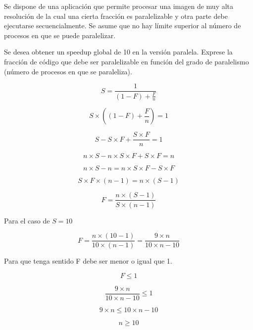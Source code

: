 \begin{acexercise}\end{acexercise}

Se dispone de una aplicación que permite procesar una imagen de muy alta
resolución de la cual una cierta fracción es paralelizable y otra parte debe
ejecutarse secuencialmente. Se asume que no hay límite superior al número de
procesos en que se puede paralelizar.

Se desea obtener un speedup global de 10 en la versión paralela.  Exprese la
fracción de código que debe ser paralelizable en función del grado de
paralelismo (número de procesos en que se paraleliza).


\begin{acsolution}\end{acsolution}

\[
S = \frac{1}{\left(1 - F \right) + \displaystyle \frac{F}{n} }
\]

\[
S \times \left( (1-F) + \frac{F}{n} \right) = 1
\]

\[
S - S \times F + \frac{S \times F}{n} = 1
\]

\[
n \times S - n \times S \times F + S \times F = n
\]

\[
n \times S - n = n \times S \times F - S \times F
\]

\[
S \times F \times \left( n - 1 \right) = n \times \left( S - 1 \right)
\]

\[
F = \frac{n \times (S-1)}{S \times(n-1)}
\]

Para el caso de $S = 10$

\[
F = \frac{n \times (10-1)}{10 \times (n-1)} = 
\frac{9 \times n}{10 \times n - 10}
\]

Para que tenga sentido F debe ser menor o igual que 1. 

\[
F \leq 1
\]

\[
\frac{9 \times n}{10 \times n -10} \leq 1
\]

\[
9 \times n \leq 10 \times n-10
\]

\[
n \geq 10
\]


